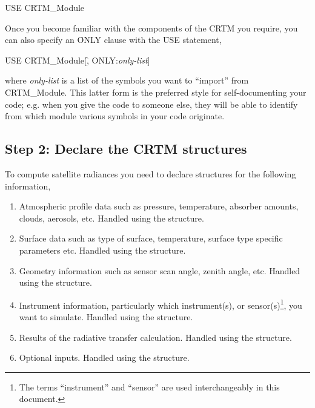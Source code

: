 \qquad\f{USE CRTM\_Module}

Once you become familiar with the components of the CRTM you require, you can also specify an \f{ONLY} clause with the \f{USE} statement,

\qquad\f{USE CRTM\_Module}[\f{, ONLY:}\textit{only-list}]

where \textit{only-list} is a list of the symbols you want to ``import'' from \f{CRTM\_Module}. This latter form is the preferred style for self-documenting your code; e.g. when you give the code to someone else, they will be able to identify from which module various symbols in your code originate.


\subsection{Step 2: Declare the CRTM structures}
\label{sec:declare_step}
To compute satellite radiances you need to declare structures for the following information,\vspace{-2ex}
\begin{enumerate}
  \item Atmospheric profile data such as pressure, temperature, absorber amounts, clouds, aerosols, etc. Handled using the \hyperref[sec:atmosphere_structure]{\Atmosphere} structure.
  \item Surface data such as type of surface, temperature, surface type specific parameters etc. Handled using the \hyperref[sec:surface_structure]{\Surface} structure.
  \item Geometry information such as sensor scan angle, zenith angle, etc. Handled using the \hyperref[sec:geometry_structure]{\Geometry} structure.
  \item Instrument information, particularly which instrument(s), or sensor(s)\footnote{The terms ``instrument'' and ``sensor'' are used interchangeably in this document.}, you want to simulate. Handled using the \hyperref[sec:channelinfo_structure]{\ChannelInfo} structure.
  \item Results of the radiative transfer calculation. Handled using the \hyperref[sec:rtsolution_structure]{\RTSolution} structure.
  \item Optional inputs. Handled using the \hyperref[sec:options_structure]{\Options} structure.
\end{enumerate}

